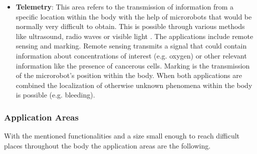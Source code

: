 \begin{itemize}
\item \textbf{Telemetry}: This area refers to the transmission of information from a specific location within the body with the help of microrobots that would be normally very difficult to obtain\cite{Nelson2010}. This is possible through various methods like ultrasound, radio waves or visible light \cite{Jepsen2002}. The applications include remote sensing and marking. Remote sensing transmits a signal that could contain information about concentrations of interest (e.g. oxygen) or other relevant information like the presence of cancerous cells\cite{Nelson2010}. Marking is the transmission of the microrobot's position within the body. When both applications are combined the localization of otherwise unknown phenomena within the body is possible (e.g. bleeding). 

\end{itemize}
\subsubsection{Application Areas}
With the mentioned functionalities and a size small enough to reach difficult places throughout the body the application areas are the following.

